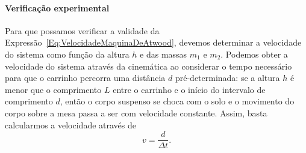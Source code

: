 \paragraph{Verificação experimental}

Para que possamos verificar a validade da Expressão~\eqref{Eq:VelocidadeMaquinaDeAtwood}, devemos determinar a velocidade do sistema como função da altura $h$ e das massas $m_1$ e $m_2$. Podemos obter a velocidade do sistema através da cinemática ao considerar o tempo necessário para que o carrinho percorra uma distância $d$ pré-determinada: se a altura $h$ é menor que o comprimento $L$ entre o carrinho e o início do intervalo de comprimento $d$, então o corpo suspenso se choca com o solo e o movimento do corpo sobre a mesa passa a ser com velocidade constante. Assim, basta calcularmos a velocidade através de 
\begin{equation}
    v = \frac{d}{\Delta t}.
\end{equation}

